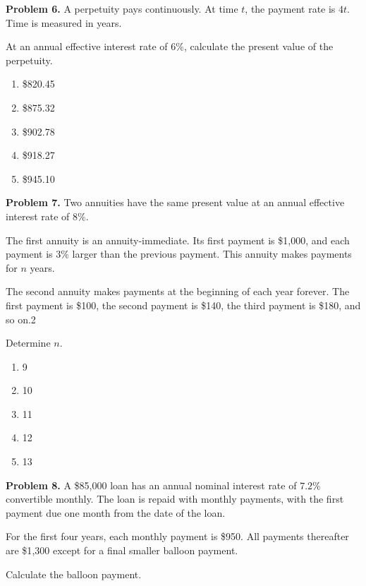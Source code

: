 \documentclass[12pt]{article}
\begin{document}
\newpage

\noindent \textbf{Problem 6.}
A perpetuity pays continuously. At time $t$, the payment rate is $4t$. Time is measured in years.

At an annual effective interest rate of $6\%$, calculate the present value of the perpetuity.

\vspace{.5cm}

\begin{enumerate}[label = \Alph*.]
\item \$820.45
\item \$875.32
\item \$902.78
\item \$918.27
\item \$945.10
\end{enumerate}

\newpage

\noindent \textbf{Problem 7.}
Two annuities have the same present value at an annual effective interest rate of $8\%$.

The first annuity is an annuity-immediate. Its first payment is \$1{,}000, and each payment is $3\%$ larger than the previous payment. This annuity makes payments for $n$ years.

The second annuity makes payments at the beginning of each year forever. The first payment is \$100, the second payment is \$140, the third payment is \$180, and so on.2

Determine $n$.

\vspace{.5cm}

\begin{enumerate}[label = \Alph*.]
\item 9
\item 10
\item 11
\item 12
\item 13
\end{enumerate}

\newpage

\noindent \textbf{Problem 8.}
A \$85{,}000 loan has an annual nominal interest rate of $7.2\%$ convertible monthly. The loan is repaid with monthly payments, with the first payment due one month from the date of the loan.

For the first four years, each monthly payment is \$950. All payments thereafter are \$1{,}300 except for a final smaller balloon payment.

Calculate the balloon payment.
\end{document}
